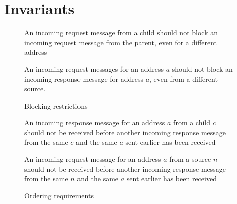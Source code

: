 \section{Invariants}
\label{sec:invariants}


\begin{figure}
\begin{inv}
An incoming request message from a child should not block an incoming request
message from the parent, even for a different address\label{cReqNoBlockPReq}
\end{inv}
\begin{inv}
An incoming request messages for an address $a$ should not block an incoming
response message for address $a$, even from a different
source.\label{reqNoBlockReq}
\end{inv}
\caption{Blocking restrictions}
\label{blocking}
\end{figure}

\begin{figure}
\begin{inv}
An incoming response message for an address $a$ from a child $c$ should not be
received before another incoming response message from the same $c$ and the
same $a$ sent earlier has been received\label{cRespFifo}
\end{inv}
\begin{inv}
An incoming request message for an address $a$ from a source $n$ should not be
received before another incoming response message from the same $n$ and the
same $a$ sent earlier has been received\label{reqNoOvertakeResp}
\end{inv}
\caption{Ordering requirements}
\label{order}
\end{figure}


